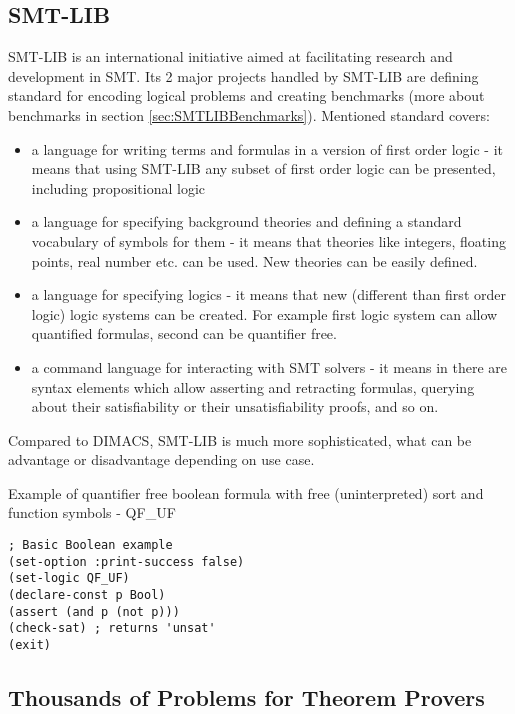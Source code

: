 \subsection{SMT-LIB}

SMT-LIB \cite{BarFT-RR-17} is an international initiative aimed at facilitating research and development in \gls{SMT}. Its 2 major projects handled by SMT-LIB are defining standard for encoding logical problems and creating benchmarks (more about benchmarks in section \ref{sec:SMTLIBBenchmarks}). Mentioned standard covers:

\begin{itemize}
  \item a language for writing terms and formulas in a version of first order logic - it means that using SMT-LIB any subset of first order logic can be presented, including propositional logic
  \item a language for specifying background theories and defining a standard vocabulary of symbols for them - it means that theories like integers, floating points, real number etc. can be used. New theories can be easily defined.
  \item a language for specifying logics - it means that new (different than first order logic) logic systems can be created. For example first logic system can allow quantified formulas, second can be quantifier free.
  \item a command language for interacting with SMT solvers - it means in there are syntax elements which allow asserting and retracting formulas, querying about their satisfiability or their unsatisfiability proofs, and so on.
\end{itemize}

Compared to DIMACS, SMT-LIB is much more sophisticated, what can be advantage or disadvantage depending on use case. 

\begin{listing}[H]
  \caption{Example of quantifier free boolean formula with free (uninterpreted) sort and function symbols - QF\_UF}
  \label{lis:SMTLIBExample}
  \begin{verbatim}
; Basic Boolean example
(set-option :print-success false)
(set-logic QF_UF)
(declare-const p Bool)
(assert (and p (not p))) 
(check-sat) ; returns 'unsat'
(exit)
  \end{verbatim}
\end{listing}

\subsection{Thousands of Problems for Theorem Provers}
\label{sub:TPTP}

